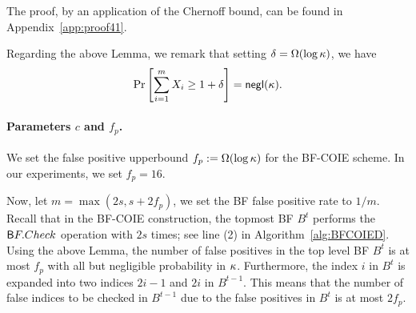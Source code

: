 The proof, by an application of the Chernoff bound, can be found in Appendix~\ref{app:proof41}. 

Regarding the above Lemma, we remark that setting $\delta =
\Omega(\log \secparam)$, we have $$\Pr\left[\sum_{i=1}^m X_i \ge 1 +
\delta \right]  = \negl(\secparam).$$


\paragraph{Parameters $c$ and $f_p$.} We set the false positive
upperbound $f_p := \Omega(\log \secparam)$ for the BF-COIE scheme. In
our experiments, we set $f_p = 16$. 

Now, let $m = \max(2s, s+2f_p)$, we set the BF false positive rate to $1/m$.
Recall that in the BF-COIE construction, the topmost BF $B^t$ performs the $\sf
BF.Check$ operation with $2s$ times; see line (2) in
Algorithm~\ref{alg:BFCOIED}. Using the above Lemma, the number of false
positives in the top level BF $B^t$ is at most $f_p$  with all but
negligible probability in $\secparam$. Furthermore, the index $i$ in
$B^t$ is expanded into two indices $2i-1$ and $2i$ in $B^{t-1}$. This
means that the number of false indices to be checked in $B^{t-1}$ due to
the false positives in $B^t$ is at most
$2f_p$. 

